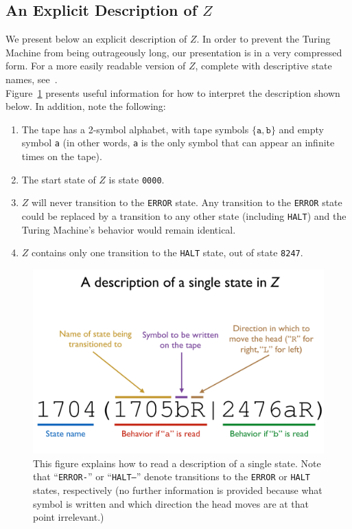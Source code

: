 \documentclass[11pt]{article}
\newcommand{\zhaltstate}{\texttt{8247}}
\begin{document}
\subsection{An Explicit Description of $Z$}

We present below an explicit description of $Z$. In order to prevent the Turing Machine from being outrageously long, our presentation is in a very compressed form. For a more easily readable version of $Z$, complete with descriptive state names, see~\cite{github}. \\

Figure~\ref{fig:syntax} presents useful information for how to interpret the description shown below. In addition, note the following:

\begin{enumerate}

\item The tape has a 2-symbol alphabet, with tape symbols $\{\texttt{a}, \texttt{b}\}$ and empty symbol \texttt{a} (in other words, \texttt{a} is the only symbol that can appear an infinite times on the tape).
\item The start state of $Z$ is state \texttt{0000}.
\item $Z$ will never transition to the \texttt{ERROR} state. Any transition to the \texttt{ERROR} state could be replaced by a transition to any other state (including \texttt{HALT}) and the Turing Machine's behavior would remain identical.
\item $Z$ contains only one transition to the \texttt{HALT} state, out of state \zhaltstate.

\end{enumerate}

\begin{figure} 
\begin{center} 
\includegraphics[scale=0.6]{figs/syntax.png}
\caption{This figure explains how to read a description of a single state. Note that ``\texttt{ERROR-}'' or ``\texttt{HALT--}'' denote transitions to the \texttt{ERROR} or \texttt{HALT} states, respectively (no further information is provided because what symbol is written and which direction the head moves are at that point irrelevant.) \label{fig:syntax}} 
\end{center} 
\end{figure}
\end{document}
